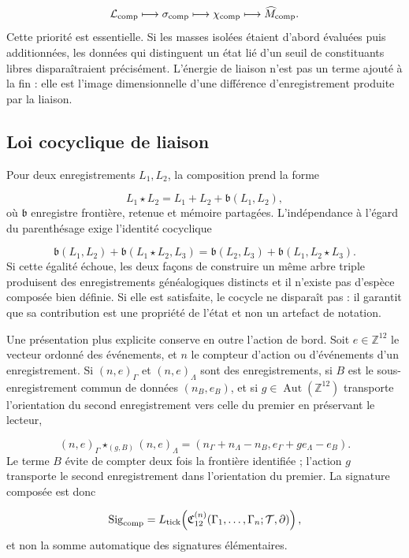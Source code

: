 \[
\mathcal L_{\rm comp}
\longmapsto \sigma_{\rm comp}
\longmapsto \chi_{\rm comp}
\longmapsto \widehat M_{\rm comp}.
\]
Cette priorité est essentielle. Si les masses isolées étaient d'abord évaluées puis additionnées, les données qui distinguent un état lié d'un seuil de constituants libres disparaîtraient précisément. L'énergie de liaison n'est pas un terme ajouté à la fin : elle est l'image dimensionnelle d'une différence d'enregistrement produite par la liaison.

\subsection{Loi cocyclique de liaison}
Pour deux enregistrements \(L_1,L_2\), la composition prend la forme

\[
L_1\star L_2
=L_1+L_2+\mathfrak b(L_1,L_2),
\]
où \(\mathfrak b\) enregistre frontière, retenue et mémoire partagées. L'indépendance à l'égard du parenthésage exige l'identité cocyclique

\[
\mathfrak b(L_1,L_2)
+\mathfrak b(L_1\star L_2,L_3)
=
\mathfrak b(L_2,L_3)
+\mathfrak b(L_1,L_2\star L_3).
\]
Si cette égalité échoue, les deux façons de construire un même arbre triple produisent des enregistrements généalogiques distincts et il n'existe pas d'espèce composée bien définie. Si elle est satisfaite, le cocycle ne disparaît pas : il garantit que sa contribution est une propriété de l'état et non un artefact de notation.

Une présentation plus explicite conserve en outre l'action de bord. Soit \(e\in\mathbb Z^{12}\) le vecteur ordonné des événements, et \(n\) le compteur d'action ou d'événements d'un enregistrement. Si \((n,e)_\Gamma\) et \((n,e)_\Lambda\) sont des enregistrements, si \(B\) est le sous-enregistrement commun de données \((n_B,e_B)\), et si \(g\in\operatorname{Aut}(\mathbb Z^{12})\) transporte l'orientation du second enregistrement vers celle du premier en préservant le lecteur,

\[
(n,e)_\Gamma\star_{(g,B)}(n,e)_\Lambda
=
(n_\Gamma+n_\Lambda-n_B,
e_\Gamma+g e_\Lambda-e_B).
\]
Le terme \(B\) évite de compter deux fois la frontière identifiée ; l'action \(g\) transporte le second enregistrement dans l'orientation du premier. La signature composée est donc

\[
\operatorname{Sig}_{\rm comp}
=L_{\rm tick}\!\left(
\mathfrak C_{12}^{(n)}
(\Gamma_1,\ldots,\Gamma_n;\mathcal T,\partial)
\right),
\]
et non la somme automatique des signatures élémentaires.

